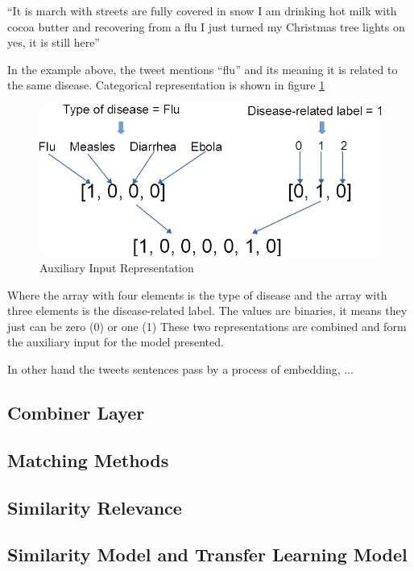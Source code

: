 \documentclass[12pt]{report}
\begin{document}
\begin{definition}
``It is march with streets are fully covered in snow I am drinking hot milk with cocoa butter and recovering from a flu I just turned my Christmas tree lights on yes, it is still here''
\end{definition}

In the example above, the tweet mentions ``flu'' and its meaning it is related to the same disease. Categorical representation is shown in figure \ref{figure:categorical}

\begin{figure}[H]	
	\centering
	\includegraphics[width=130mm, scale = 1]{images/10_categorical.png}	
	\caption{Auxiliary Input Representation}	
	\label{figure:categorical}
\end{figure}

\noindent Where the array with four elements is the type of disease and the array with three elements is the disease-related label. The values are binaries, it means they just can be zero (0) or one (1) These two representations are combined and form the auxiliary input for the model presented.

In other hand the tweets sentences pass by a process of embedding, ...


\subsection{Combiner Layer}

\subsection{Matching Methods}

\subsection{Similarity Relevance}

\subsection{Similarity Model and Transfer Learning Model}
\end{document}
